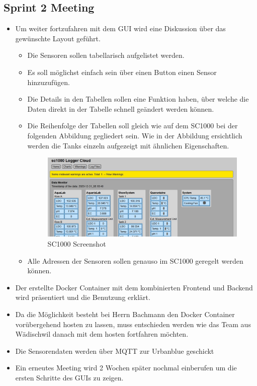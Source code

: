 \documentclass[a4paper]{article}
\begin{document}
	\subsection{Sprint 2 Meeting}
	\begin{itemize}
		\item Um weiter fortzufahren mit dem GUI wird eine Diskussion über das gewünschte Layout geführt. 
		\begin{itemize}
			\item Die Sensoren sollen tabellarisch aufgelistet werden. 
			\item Es soll möglichst einfach sein über einen Button einen Sensor hinzuzufügen.
			\item Die Details in den Tabellen sollen eine Funktion haben, über welche die Daten direkt in der Tabelle schnell geändert werden können.
			\item Die Reihenfolge der Tabellen soll gleich wie auf dem SC1000 bei der folgenden Abbildung gegliedert sein.
			Wie in der Abbildung ersichtlich werden die Tanks einzeln aufgezeigt mit ähnlichen Eigenschaften. 
			\begin{figure}[h]
				\centering
				\includegraphics[scale=0.4]{SC1000_Example}
				\caption{SC1000 Screenshot}
				\label{fig:SC1000_Example}
			\end{figure}
			

			\item Alle Adressen der Sensoren sollen genauso im SC1000 geregelt werden können.
		\end{itemize}
		\item Der erstellte Docker Container mit dem kombinierten Frontend und Backend wird präsentiert und die Benutzung erklärt.
		\item Da die Möglichkeit besteht bei Herrn Bachmann den Docker Container vorübergehend hosten zu lassen, muss entschieden werden wie das Team aus Wädischwil danach mit dem hosten fortfahren möchten.
		\item Die Sensorendaten werden über MQTT zur Urbanblue geschickt
		\item Ein erneutes Meeting wird 2 Wochen später nochmal einberufen um die ersten Schritte des GUIs zu zeigen.
	\end{itemize}
\end{document}

